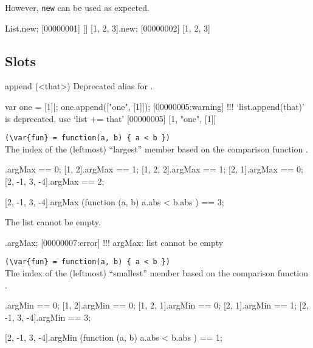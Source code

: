 However, \lstinline|new| can be used as expected.

\begin{urbiscript}
List.new;
[00000001] []
[1, 2, 3].new;
[00000002] [1, 2, 3]
\end{urbiscript}

\subsection{Slots}

\begin{urbiscriptapi}
\item[append](<that>)%
  Deprecated alias for .

\begin{urbiscript}
var one = [1]|;
one.append(["one", [1]]);
[00000005:warning] !!! `list.append(that)' is deprecated, use `list += that'
[00000005] [1, "one", [1]]
\end{urbiscript}

\item {}\lstinline|(\var{fun} = function(a, b) { a < b })|\\%
  The index of the (leftmost) ``largest'' member based on the comparison
  function .
\begin{urbiassert}
           [1].argMax == 0;
        [1, 2].argMax == 1;
     [1, 2, 2].argMax == 1;
        [2, 1].argMax == 0;
[2, -1, 3, -4].argMax == 2;

[2, -1, 3, -4].argMax (function (a, b) { a.abs < b.abs }) == 3;
\end{urbiassert}

The list cannot be empty.

\begin{urbiscript}
[].argMax;
[00000007:error] !!! argMax: list cannot be empty
\end{urbiscript}


\item {}\lstinline|(\var{fun} = function(a, b) { a < b })|\\%
  The index of the (leftmost) ``smallest'' member based on the comparison
  function .
\begin{urbiassert}
           [1].argMin == 0;
        [1, 2].argMin == 0;
     [1, 2, 1].argMin == 0;
        [2, 1].argMin == 1;
[2, -1, 3, -4].argMin == 3;

[2, -1, 3, -4].argMin (function (a, b) { a.abs < b.abs }) == 1;
\end{urbiassert}


\end{urbiscriptapi}
